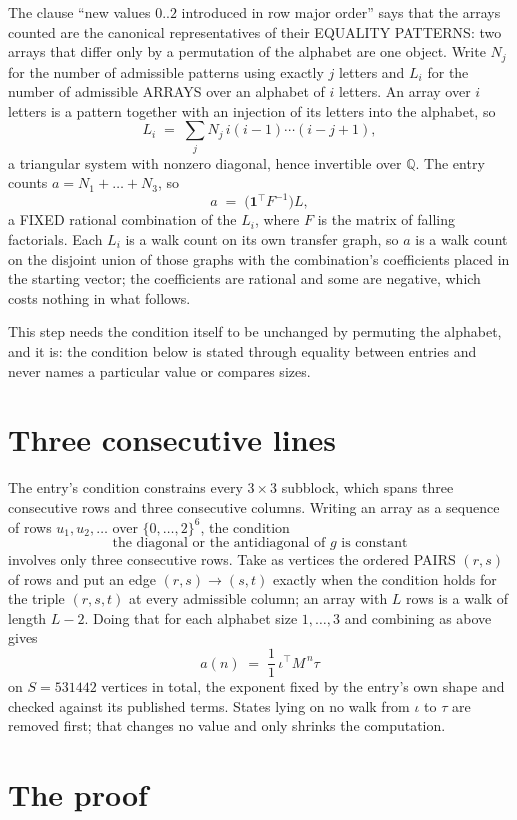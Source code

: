 \documentclass[11pt,a4paper]{article}
\theoremstyle{plain}
\theoremstyle{definition}
\begin{document}
The clause ``new values $0..2$ introduced in row major order'' says that the arrays
counted are the canonical representatives of their EQUALITY PATTERNS: two arrays that differ
only by a permutation of the alphabet are one object. Write $N_j$ for the number of admissible
patterns using exactly $j$ letters and $L_i$ for the number of admissible ARRAYS over an
alphabet of $i$ letters. An array over $i$ letters is a pattern together with an injection of
its letters into the alphabet, so
\[
L_i\;=\;\sum_{j}N_j\,i(i-1)\cdots(i-j+1),
\]
a triangular system with nonzero diagonal, hence invertible over $\mathbb{Q}$. The entry
counts $a=N_1+\dots+N_{3}$, so
\[
a\;=\;\bigl(\mathbf{1}^{\!\top}F^{-1}\bigr)L ,
\]
a FIXED rational combination of the $L_i$, where $F$ is the matrix of falling factorials.
Each $L_i$ is a walk count on its own transfer graph, so $a$ is a walk count on the disjoint
union of those graphs with the combination's coefficients placed in the starting vector; the
coefficients are rational and some are negative, which costs nothing in what follows.

This step needs the condition itself to be unchanged by permuting the alphabet, and it is:
the condition below is stated through equality between entries and never names a particular
value or compares sizes.

\section{Three consecutive lines}

The entry's condition constrains every $3\times3$ subblock, which spans three consecutive
rows and three consecutive columns. Writing an array as a sequence of rows
$u_1,u_2,\dots$ over $\{0,\dots,2\}^{6}$, the condition
\[
\text{the diagonal or the antidiagonal of }g\text{ is constant}
\]
involves only three consecutive rows. Take as vertices the ordered PAIRS $(r,s)$ of
rows and put an edge $(r,s)\to(s,t)$ exactly when the condition holds for the triple
$(r,s,t)$ at every admissible column; an array with $L$ rows is a walk of length $L-2$.
Doing that for each alphabet size $1,\dots,3$ and combining as above gives
\[
a(n)\;=\;\frac{1}{1}\,\iota^{\!\top}M^{\,n}\tau
\]
on $S=531442$ vertices in total, the exponent fixed by the entry's own shape and checked against
its published terms. States lying on no walk from $\iota$ to $\tau$ are removed first; that
changes no value and only shrinks the computation.

\section{The proof}
\end{document}
